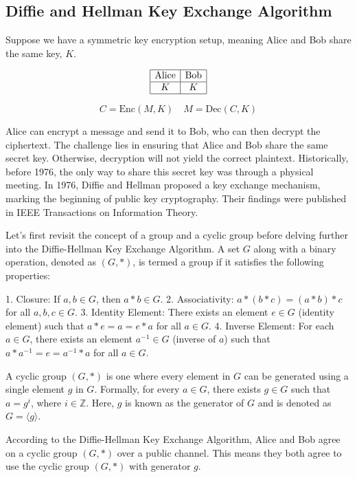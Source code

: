 \documentclass[11pt]{article}
\begin{document}
\subsection{Diffie and Hellman Key Exchange Algorithm}
Suppose we have a symmetric key encryption setup, meaning Alice and Bob share the same key, \( K \).

\[
\begin{array}{|c|c|}
\hline
\text{Alice} & \text{Bob} \\
\hline
K & K \\
\hline
\end{array}
\]

\[ C = \text{Enc}(M, K) \quad M = \text{Dec}(C, K) \]

Alice can encrypt a message and send it to Bob, who can then decrypt the ciphertext. The challenge lies in ensuring that Alice and Bob share the same secret key. Otherwise, decryption will not yield the correct plaintext. Historically, before 1976, the only way to share this secret key was through a physical meeting. In 1976, Diffie and Hellman proposed a key exchange mechanism, marking the beginning of public key cryptography. Their findings were published in IEEE Transactions on Information Theory.

Let's first revisit the concept of a group and a cyclic group before delving further into the Diffie-Hellman Key Exchange Algorithm. A set \( G \) along with a binary operation, denoted as \( (G, *) \), is termed a group if it satisfies the following properties:

1. Closure: If \( a, b \in G \), then \( a * b \in G \).
2. Associativity: \( a * (b * c) = (a * b) * c \) for all \( a, b, c \in G \).
3. Identity Element: There exists an element \( e \in G \) (identity element) such that \( a * e = a = e * a \) for all \( a \in G \).
4. Inverse Element: For each \( a \in G \), there exists an element \( a^{-1} \in G \) (inverse of \( a \)) such that \( a * a^{-1} = e = a^{-1} * a \) for all \( a \in G \).

A cyclic group \( (G, *) \) is one where every element in \( G \) can be generated using a single element \( g \) in \( G \). Formally, for every \( a \in G \), there exists \( g \in G \) such that \( a = g^i \), where \( i \in \mathbb{Z} \). Here, \( g \) is known as the generator of \( G \) and is denoted as \( G = \langle g \rangle \).

According to the Diffie-Hellman Key Exchange Algorithm, Alice and Bob agree on a cyclic group \( (G, *) \) over a public channel. This means they both agree to use the cyclic group \( (G, *) \) with generator \( g \).
\end{document}
